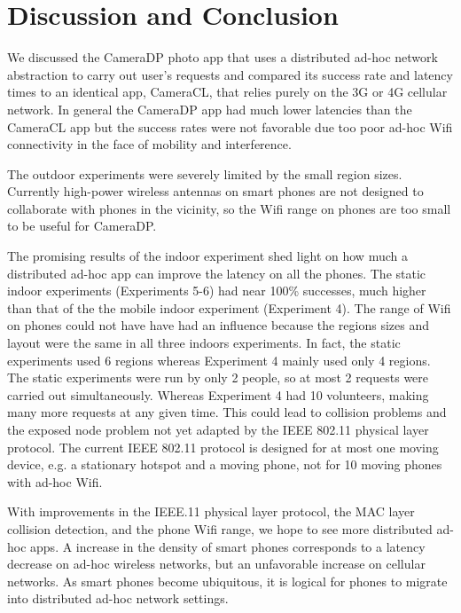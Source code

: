 \chapter{Discussion and Conclusion}

We discussed the CameraDP photo app that uses a distributed ad-hoc network abstraction to carry out user's requests and compared its success rate and latency times to an identical app, CameraCL, that relies purely on the 3G or 4G cellular network. In general the CameraDP app had much lower latencies than the CameraCL app but the success rates were not favorable due too poor ad-hoc Wifi connectivity in the face of mobility and interference.

The outdoor experiments were severely limited by the small region sizes. Currently high-power wireless antennas on smart phones are not designed to collaborate with phones in the vicinity, so the Wifi range on phones are too small to be useful for CameraDP.

The promising results of the indoor experiment shed light on how much a distributed ad-hoc app can improve the latency on all the phones. The static indoor experiments (Experiments 5-6) had near 100\% successes, much higher than that of the the mobile indoor experiment (Experiment 4). The range of Wifi on phones could not have have had an influence because the regions sizes and layout were the same in all three indoors experiments. In fact, the static experiments used 6 regions whereas Experiment 4 mainly used only 4 regions. The static experiments were run by only 2 people, so at most 2 requests were carried out simultaneously. Whereas Experiment 4 had 10 volunteers, making many more requests at any given time. This could lead to collision problems and the exposed node problem not yet adapted by the IEEE 802.11 physical layer protocol. The current IEEE 802.11 protocol is designed for at most one moving device, e.g. a stationary hotspot and a moving phone, not for 10 moving phones with ad-hoc Wifi.

With improvements in the IEEE.11 physical layer protocol, the MAC layer collision detection, and the phone Wifi range, we hope to see more distributed ad-hoc apps. A increase in the density of smart phones corresponds to a latency decrease on ad-hoc wireless networks, but an unfavorable increase on cellular networks. As smart phones become ubiquitous, it is logical for phones to migrate into distributed ad-hoc network settings.